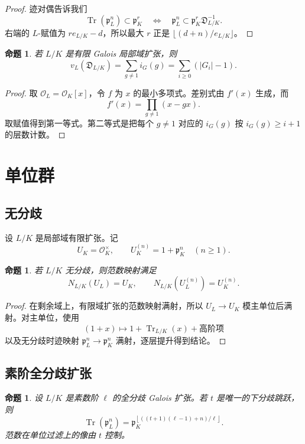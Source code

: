 \documentclass[11pt,a4paper,openany]{ctexbook}
\numberwithin{equation}{chapter}
\theoremstyle{plain}
\newtheorem{proposition}[theorem]{命题}
\theoremstyle{definition}
\theoremstyle{remark}
\begin{document}
\begin{proof}
迹对偶告诉我们
\[
  \operatorname{Tr}(\mathfrak p_L^n)\subset \mathfrak p_K^r
  \quad\Longleftrightarrow\quad
  \mathfrak p_L^n\subset \mathfrak p_K^r\mathfrak D_{L/K}^{-1}.
\]
右端的 $L$-赋值为 $re_{L/K}-d$，所以最大 $r$ 正是 $\lfloor(d+n)/e_{L/K}\rfloor$。
\end{proof}

\begin{proposition}
若 $L/K$ 是有限 Galois 局部域扩张，则
\[
  v_L(\mathfrak D_{L/K})=\sum_{g\ne1}i_G(g)=\sum_{i\ge0}(|G_i|-1).
\]
\end{proposition}

\begin{proof}
取 $\mathcal O_L=\mathcal O_K[x]$，令 $f$ 为 $x$ 的最小多项式。差别式由 $f'(x)$ 生成，而
\[
  f'(x)=\prod_{g\ne1}(x-gx).
\]
取赋值得到第一等式。第二等式是把每个 $g\ne1$ 对应的 $i_G(g)$ 按 $i_G(g)\ge i+1$ 的层数计数。
\end{proof}

\section{单位群}

\subsection{无分歧}

设 $L/K$ 是局部域有限扩张。记
\[
  U_K=\mathcal O_K^\times,\qquad U_K^{(n)}=1+\mathfrak p_K^n\quad(n\ge1).
\]

\begin{proposition}
若 $L/K$ 无分歧，则范数映射满足
\[
  N_{L/K}(U_L)=U_K,\qquad N_{L/K}(U_L^{(n)})=U_K^{(n)}.
\]
\end{proposition}

\begin{proof}
在剩余域上，有限域扩张的范数映射满射，所以 $U_L\to U_K$ 模主单位后满射。对主单位，使用
\[
  (1+x)\mapsto 1+\operatorname{Tr}_{L/K}(x)+\text{高阶项}
\]
以及无分歧时迹映射 $\mathfrak p_L^n\to\mathfrak p_K^n$ 满射，逐层提升得到结论。
\end{proof}

\subsection{素阶全分歧扩张}

\begin{proposition}
设 $L/K$ 是素数阶 $\ell$ 的全分歧 Galois 扩张。若 $t$ 是唯一的下分歧跳跃，则
\[
  \operatorname{Tr}(\mathfrak p_L^n)=\mathfrak p_K^{\left\lfloor ((t+1)(\ell-1)+n)/\ell\right\rfloor}.
\]
范数在单位过滤上的像由 $t$ 控制。
\end{proposition}
\end{document}
